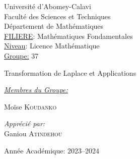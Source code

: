\documentclass[12pt,a4paper]{report}
\begin{document}
\begin{titlepage}

\pagecolor{cyan!10}
\newcommand{\HRule}{\rule{\linewidth}{0.5mm}} %



\vspace*{2cm}
\begin{center}
    {\LARGE Université d'Abomey-Calavi}\\[0.5cm]
    {\Large Faculté des Sciences et Techniques}\\[0.5cm]
    {\large Département de Mathématiques}\\[1.5cm]
    
    \underline{FILIERE}: Mathématiques Fondamentales\\
    \underline{Niveau}: Licence Mathématique\\
    \underline{Groupe:} 37\\[1cm]
    
    \begin{tcolorbox}[colframe=orange, colback=orange!50, boxrule=2pt, arc=8pt, title={\textbf{Thème}}]
        \begin{center}
            \Large Transformation de Laplace et Applications
        \end{center}
    \end{tcolorbox}
    
    \vspace{2cm}
    
    \begin{minipage}{0.45\textwidth}
        \begin{flushleft} \large
           \underline{\emph{Membres du Groupe:}}\\
           \vspace{1cm}
           
            Moïse \textsc{Koudanko}
           
        \end{flushleft}
    \end{minipage}
    \begin{minipage}{0.45\textwidth}
        \begin{flushright} \large
            \emph{Apprécié par:} \\
            Ganiou \textsc{Atindehou}
        \end{flushright}
    \end{minipage}
    
    \vfill
    
    {\large Année Académique: 2023--2024}
\end{center}

\end{titlepage}
\end{document}
